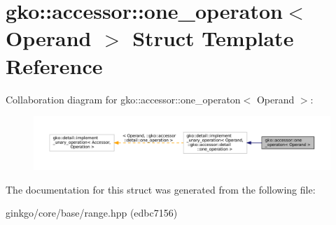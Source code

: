 \hypertarget{structgko_1_1accessor_1_1one__operaton}{}\section{gko\+:\+:accessor\+:\+:one\+\_\+operaton$<$ Operand $>$ Struct Template Reference}
\label{structgko_1_1accessor_1_1one__operaton}


Collaboration diagram for gko\+:\+:accessor\+:\+:one\+\_\+operaton$<$ Operand $>$\+:
\nopagebreak
\begin{figure}[H]
\begin{center}
\leavevmode
\includegraphics[width=350pt]{structgko_1_1accessor_1_1one__operaton__coll__graph}
\end{center}
\end{figure}


The documentation for this struct was generated from the following file\+:\begin{DoxyCompactItemize}
\item 
ginkgo/core/base/range.\+hpp (edbc7156)\end{DoxyCompactItemize}

